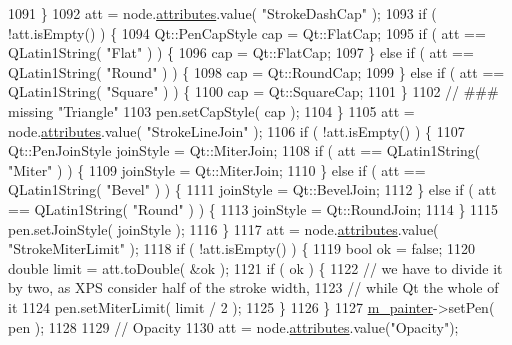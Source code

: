 \begin{DoxyCode}
1091     \}
1092     att = node.\hyperlink{classXpsRenderNode_a7f6fca2e06dd119e7eb20139af6c8477}{attributes}.value( \textcolor{stringliteral}{"StrokeDashCap"} );
1093     \textcolor{keywordflow}{if}  ( !att.isEmpty() ) \{
1094         Qt::PenCapStyle cap = Qt::FlatCap;
1095         \textcolor{keywordflow}{if} ( att == QLatin1String( \textcolor{stringliteral}{"Flat"} ) ) \{
1096             cap = Qt::FlatCap;
1097         \} \textcolor{keywordflow}{else} \textcolor{keywordflow}{if} ( att == QLatin1String( \textcolor{stringliteral}{"Round"} ) ) \{
1098             cap = Qt::RoundCap;
1099         \} \textcolor{keywordflow}{else} \textcolor{keywordflow}{if} ( att == QLatin1String( \textcolor{stringliteral}{"Square"} ) ) \{
1100             cap = Qt::SquareCap;
1101         \}
1102         \textcolor{comment}{// ### missing "Triangle"}
1103         pen.setCapStyle( cap );
1104     \}
1105     att = node.\hyperlink{classXpsRenderNode_a7f6fca2e06dd119e7eb20139af6c8477}{attributes}.value( \textcolor{stringliteral}{"StrokeLineJoin"} );
1106     \textcolor{keywordflow}{if}  ( !att.isEmpty() ) \{
1107         Qt::PenJoinStyle joinStyle = Qt::MiterJoin;
1108         \textcolor{keywordflow}{if} ( att == QLatin1String( \textcolor{stringliteral}{"Miter"} ) ) \{
1109             joinStyle = Qt::MiterJoin;
1110         \} \textcolor{keywordflow}{else} \textcolor{keywordflow}{if} ( att == QLatin1String( \textcolor{stringliteral}{"Bevel"} ) ) \{
1111             joinStyle = Qt::BevelJoin;
1112         \} \textcolor{keywordflow}{else} \textcolor{keywordflow}{if} ( att == QLatin1String( \textcolor{stringliteral}{"Round"} ) ) \{
1113             joinStyle = Qt::RoundJoin;
1114         \}
1115         pen.setJoinStyle( joinStyle );
1116     \}
1117     att = node.\hyperlink{classXpsRenderNode_a7f6fca2e06dd119e7eb20139af6c8477}{attributes}.value( \textcolor{stringliteral}{"StrokeMiterLimit"} );
1118     \textcolor{keywordflow}{if}  ( !att.isEmpty() ) \{
1119         \textcolor{keywordtype}{bool} ok = \textcolor{keyword}{false};
1120         \textcolor{keywordtype}{double} limit = att.toDouble( &ok );
1121         \textcolor{keywordflow}{if} ( ok ) \{
1122             \textcolor{comment}{// we have to divide it by two, as XPS consider half of the stroke width,}
1123             \textcolor{comment}{// while Qt the whole of it}
1124             pen.setMiterLimit( limit / 2 );
1125         \}
1126     \}
1127     \hyperlink{classXpsHandler_a2db77df5312274e6f1d7e274b45c9d21}{m\_painter}->setPen( pen );
1128 
1129     \textcolor{comment}{// Opacity}
1130     att = node.\hyperlink{classXpsRenderNode_a7f6fca2e06dd119e7eb20139af6c8477}{attributes}.value(\textcolor{stringliteral}{"Opacity"});

\end{DoxyCode}
